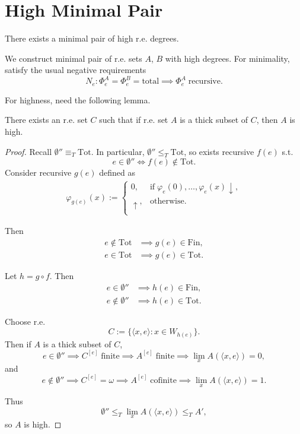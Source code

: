 \section{High Minimal Pair}
  \begin{goal}
    There exists a minimal pair of high r.e. degrees.
  \end{goal}

  We construct minimal pair of r.e. sets $A$, $B$ with high degrees.
  For minimality, satisfy the usual negative requirements
  \[N_e: \Phi_e^A=\Phi_e^B=\text{total} \implies \Phi_e^A\;
  \text{recursive}.\]

  For highness, need the following lemma.
  \begin{lemma}
    \label{lem:high-req}
    There exists an r.e. set $C$ such that if r.e. set $A$ is a thick
    subset of $C$, then $A$ is high.
  \end{lemma}
  \begin{proof}
    Recall $\emptyset''\equiv_T\text{Tot}$. In
    particular, $\emptyset''\leq_T\text{Tot}$, so exists recursive $f(e)$
    s.t.
    \[e\in\emptyset'' \Leftrightarrow f(e)\not\in\text{Tot}.\]
    Consider recursive $g(e)$ defined as
    \begin{align*}
      \varphi_{g(e)}(x) :=
      \begin{cases}
        0, &\text{if}\; \varphi_e(0),\ldots,\varphi_e(x)\downarrow,\\
        \uparrow, &\text{otherwise}.\\
      \end{cases}
    \end{align*}

    Then
    \begin{align*}
      e\not\in\text{Tot} &\implies g(e)\in\text{Fin},\\
      e\in\text{Tot} &\implies g(e)\in\text{Tot}.
    \end{align*}

    Let $h=g\circ f$. Then
    \begin{align*}
      e\in\emptyset'' &\implies h(e)\in\text{Fin},\\
      e\not\in\emptyset'' &\implies h(e)\in\text{Tot}.
    \end{align*}

    Choose r.e.
    \[C :=\{\langle x,e\rangle: x\in W_{h(e)}\}.\]
    Then if $A$ is a thick subset of $C$,
    \[e\in\emptyset'' \implies C^{[e]}\; \text{finite} \implies A^{[e]}\;
    \text{finite} \implies \lim_x A(\langle x,e\rangle)=0,\]
    and
    \[e\not\in\emptyset'' \implies C^{[e]}=\omega \implies A^{[e]}\;
    \text{cofinite} \implies \lim_x A(\langle x,e\rangle)=1.\]

    Thus
    \[\emptyset''\leq_T \lim_x A(\langle x,e\rangle) \leq_T A',\]
    so $A$ is high.
  \end{proof}

